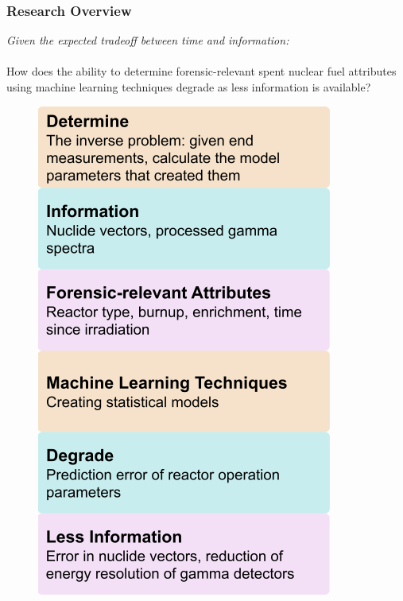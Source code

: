 
\begin{frame}
  \frametitle{Research Overview}
  \begin{adjustwidth}{-10pt}{-10pt}
  \begin{minipage}{0.6\textwidth}
    \textit{Given the expected tradeoff between time and information:} \\~\\
    How does the ability to determine forensic-relevant spent nuclear fuel
    attributes using machine learning techniques degrade as less information is
    available?
  \end{minipage}%
  \hfill
  \begin{minipage}{0.4\textwidth}
    \begin{figure}
      \centering
      \includegraphics[height=0.85\textheight]{./figures/overview.png}
    \end{figure}
  \end{minipage}
  \end{adjustwidth}
\end{frame}

